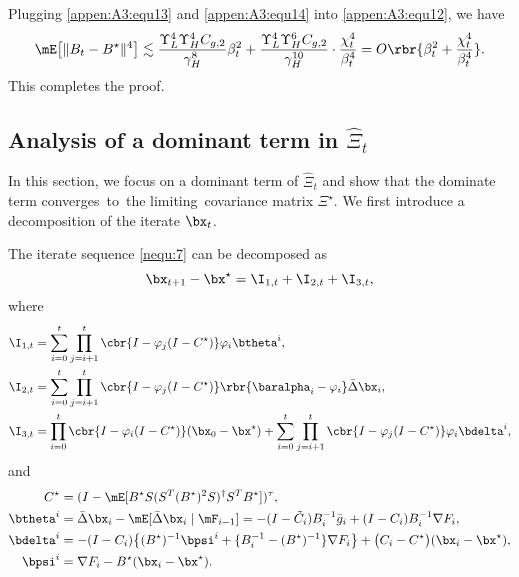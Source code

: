 Plugging \eqref{appen:A3:equ13} and \eqref{appen:A3:equ14} into \eqref{appen:A3:equ12}, we have
\begin{equation}\label{appen:A3:equ15}
\mE\big[\|B_t-B^\star\|^4\big] \lesssim \frac{\Upsilon_{L}^4\Upsilon_H^4C_{g,2}}{\gamma_H^8} \beta_t^2 + \frac{\Upsilon_{L}^4\Upsilon_H^6C_{g,2}}{\gamma_H^{10}}\cdot \frac{\chi_t^4}{\beta_t^4} = O\rbr{\beta_t^2 + \frac{\chi_t^4}{\beta_t^4}}.
\end{equation}
This completes the proof.


\subsection{Analysis of a dominant term in $\hat{\Xi}_t$}\label{appen:A4}

In this section, we focus on a dominant term of $\hat{\Xi}_t$ and show that the dominate term converges~to~the limiting~covariance matrix $\Xi^\star$. We first introduce a decomposition of the iterate $\bx_t$.

\begin{lemma}\label{appen:A4:lem1}\cite[Lemma 5.1]{Na2022Statistical}
The iterate sequence \eqref{nequ:7} can be decomposed as
\begin{equation}\label{appen:A4:equ1}
\bx_{t+1}-\bx^\star = \I_{1,t} + \I_{2,t} + \I_{3,t},
\end{equation}
where
\begin{align}
\I_{1,t} & = \sum_{i=0}^t\prod_{j=i+1}^{t}\cbr{I - \varphi_j(I-C^\star)}\varphi_i \btheta^i, \label{rec:a}\\
\I_{2,t} & = \sum_{i=0}^t\prod_{j=i+1}^{t} \cbr{I - \varphi_j(I-C^\star)}\rbr{\baralpha_i - \varphi_i}\bar{\Delta}\bx_i, \label{rec:b}\\
\I_{3,t} & = \prod_{i=0}^{t}\cbr{I - \varphi_i(I-C^\star)}(\bx_0 - \bx^\star) + \sum_{i=0}^t\prod_{j=i+1}^{t}\cbr{I - \varphi_j(I-C^\star)}\varphi_i\bdelta^i, 
\label{rec:c}
\end{align}
and
\begin{align}
C^\star &= (I - \mE[B^\star S(S^T(B^\star)^2S)^\dagger S^TB^\star])^\tau, \label{rec:def:a}\\ 
\btheta^i &= \bar{\Delta}\bx_i-\mE[\bar{\Delta}\bx_i\mid \mF_{i-1}] = -(I-\tilde{C}_i)B_i^{-1}\bar{g}_i + (I-C_i)B_i^{-1}\nabla F_i, \label{rec:def:b}\\ 
\bdelta^i &= -(I-C_i)\big\{(B^{\star})^{-1}\bpsi^i + \{B_i^{-1} - (B^\star)^{-1}\}\nabla F_i\big\}
+ \big(C_i-C^\star\big)(\bx_i - \bx^\star),\label{rec:def:c}\\ 
\bpsi^i &= \nabla F_i - B^\star(\bx_i-\bx^\star). \label{rec:def:d} 
\end{align}
\end{lemma}

